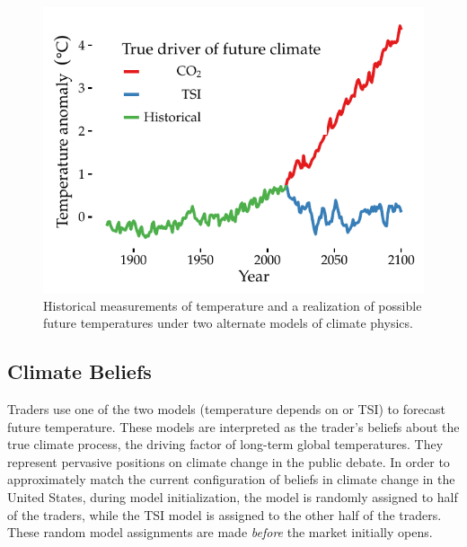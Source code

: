 \documentclass{article}\usepackage[]{graphicx}\usepackage[]{color}
\makeatletter
\def\maxwidth{ %
  \ifdim\Gin@nat@width>\linewidth
    \linewidth
  \else
    \Gin@nat@width
  \fi
}
\newenvironment{knitrout}{}{} %
\makeatother
\begin{document}
\begin{knitrout}
\color{fgcolor}\begin{figure}

{\centering \includegraphics[width=\maxwidth]{climateplot-1} 

}

\caption[Historical measurements of temperature and a realization of possible future temperatures under two alternate models of climate physics]{Historical measurements of temperature and a realization of possible future temperatures under two alternate models of climate physics.}\label{fig:climateplot}
\end{figure}


\end{knitrout}

\subsection{Climate Beliefs}

Traders use one of the two models (temperature depends on  or TSI) to forecast future temperature. 
These models are interpreted as the trader's beliefs about the true climate process, the driving factor of long-term global temperatures. 
They represent pervasive positions on climate change in the public debate. In order to approximately match the current configuration of beliefs in climate change in the United States, during model initialization, the  model is randomly assigned to half of the traders, while the TSI model is assigned to the other half of the traders. These random model assignments are made \emph{before} the market initially opens.
\end{document}

